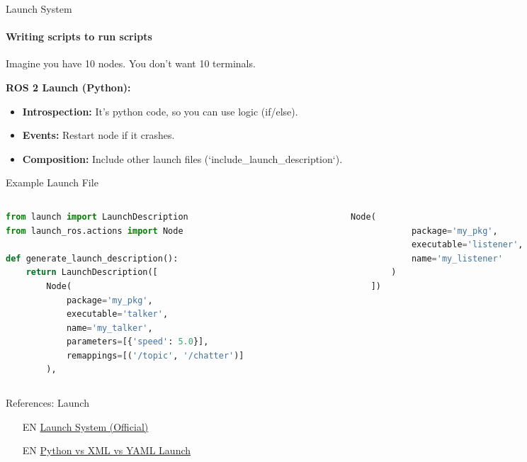 \documentclass[aspectratio=169]{beamer}
\begin{document}
\begin{frame}{Launch System}
    \framesubtitle{Writing scripts to run scripts}
    Imagine you have 10 nodes. You don't want 10 terminals.
    
    \textbf{ROS 2 Launch (Python):}
    \begin{itemize}
        \item \textbf{Introspection:} It's python code, so you can use logic (if/else).
        \item \textbf{Events:} Restart node if it crashes.
        \item \textbf{Composition:} Include other launch files (`include\_launch\_description`).
    \end{itemize}
\end{frame}

\begin{frame}[fragile]{Example Launch File}
    \scriptsize
    \begin{columns}[T]
        \begin{column}{0.48\textwidth}
\begin{lstlisting}[language=Python]
from launch import LaunchDescription
from launch_ros.actions import Node

def generate_launch_description():
    return LaunchDescription([
        Node(
            package='my_pkg',
            executable='talker',
            name='my_talker',
            parameters=[{'speed': 5.0}],
            remappings=[('/topic', '/chatter')]
        ),
\end{lstlisting}
        \end{column}
        \begin{column}{0.48\textwidth}
\begin{lstlisting}[language=Python]
        Node(
            package='my_pkg',
            executable='listener',
            name='my_listener'
        )
    ])
\end{lstlisting}
        \end{column}
    \end{columns}
\end{frame}

\begin{frame}{References: Launch}
    \begin{enumerate}
        \item [EN] \href{https://docs.ros.org/en/humble/Tutorials/Intermediate/Launch/Launch-Main.html}{Launch System (Official)}
        \item [EN] \href{https://docs.ros.org/en/humble/How-To-Guides/Launch-file-different-formats.html}{Python vs XML vs YAML Launch}
    \end{enumerate}
\end{frame}
\end{document}
